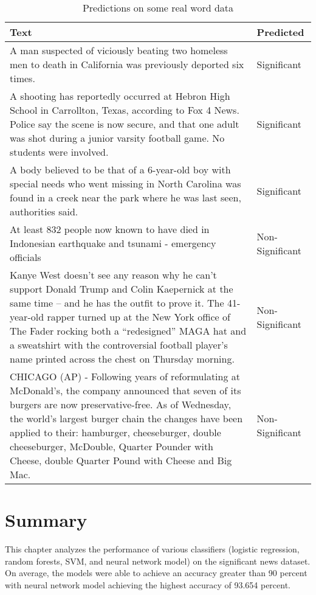 \begin{table}
\begin{center}
\caption{Predictions on some real word data}
\label{tbl:real_prediction}
\begin{tabular}{p{12cm}p{2.5cm}}
\toprule 
Text&Predicted\\
\midrule 
A man suspected of viciously beating two homeless men to death in California was previously deported six times. &Significant \\
\hline
A shooting has reportedly occurred at Hebron High School in Carrollton, Texas, according to Fox 4 News.  Police say the scene is now secure, and that one adult was shot during a junior varsity football game. No students were involved. &Significant \\
\hline
A body believed to be that of a 6-year-old boy with special needs who went missing in North Carolina was found in a creek near the park where he was last seen, authorities said.&Significant \\
\hline
At least 832 people now known to have died in Indonesian earthquake and tsunami - emergency officials &Non-Significant \\
\hline
Kanye West doesn’t see any reason why he can’t support Donald Trump and Colin Kaepernick at the same time – and he has the outfit to prove it.  The 41-year-old rapper turned up at the New York office of The Fader rocking both a “redesigned” MAGA hat and a sweatshirt with the controversial football player’s name printed across the chest on Thursday morning.&Non-Significant \\
\hline
CHICAGO (AP) - Following years of reformulating at McDonald's, the company announced that seven of its burgers are now preservative-free. As of Wednesday, the world's largest burger chain the changes have been applied to their: hamburger, cheeseburger, double cheeseburger, McDouble, Quarter Pounder with Cheese, double Quarter Pound with Cheese and Big Mac. &Non-Significant \\
\bottomrule
\end{tabular}
\end{center}
\end{table}

\section{Summary}
This chapter analyzes the performance of various classifiers (logistic regression, random forests, SVM, and neural network model) on the significant news dataset. %
On average, the models were able to achieve an accuracy greater than 90 percent with neural network model achieving the highest accuracy of 93.654 percent.
